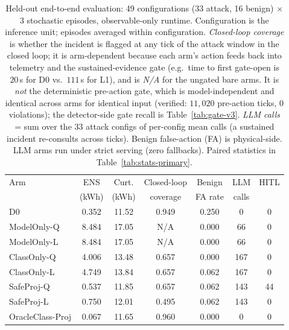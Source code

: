 \begin{table}[t]
\centering\small
\caption{Held-out end-to-end evaluation: 49 configurations (33 attack, 16
benign) $\times$ 3 stochastic episodes, observable-only runtime.
Configuration is the inference unit; episodes averaged within configuration.
\emph{Closed-loop coverage} is whether the incident is flagged at any tick of
the attack window in the closed loop; it is arm-dependent because each arm's
action feeds back into telemetry and the sustained-evidence gate (e.g.\ time to
first gate-open is $20$\,s for D0 vs.\ $111$\,s for L1), and is \emph{N/A} for
the ungated bare arms. It is \emph{not} the deterministic pre-action gate, which
is model-independent and identical across arms for identical input (verified:
$11{,}020$ pre-action ticks, $0$ violations); the detector-side gate recall is
Table~\ref{tab:gate-v3}. \emph{LLM calls} = sum over the 33 attack configs of
per-config mean calls (a sustained incident re-consults across ticks). Benign
false-action (FA) is physical-side. LLM arms run under strict serving (zero
fallbacks). Paired statistics in Table~\ref{tab:stats-primary}.}
\label{tab:holdout-v3}
\begin{tabular}{lcccccc}
\toprule
Arm & ENS & Curt. & Closed-loop & Benign & LLM & HITL \\
 & (kWh) & (kWh) & coverage & FA rate & calls & \\
\midrule
D0 & 0.352 & 11.52 & 0.949 & 0.250 & 0 & 0 \\
ModelOnly-Q & 8.484 & 17.05 & N/A & 0.000 & 66 & 0 \\
ModelOnly-L & 8.484 & 17.05 & N/A & 0.000 & 66 & 0 \\
ClassOnly-Q & 4.006 & 13.48 & 0.657 & 0.000 & 167 & 0 \\
ClassOnly-L & 4.749 & 13.84 & 0.657 & 0.062 & 167 & 0 \\
SafeProj-Q & 0.537 & 11.85 & 0.657 & 0.062 & 143 & 44 \\
SafeProj-L & 0.750 & 12.01 & 0.495 & 0.062 & 143 & 0 \\
OracleClass-Proj & 0.067 & 11.65 & 0.960 & 0.000 & 0 & 0 \\
\bottomrule
\end{tabular}
\end{table}
